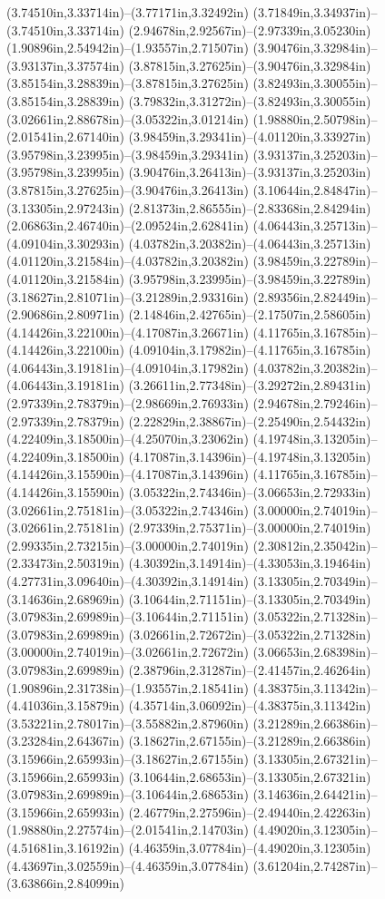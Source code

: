(3.74510in,3.33714in)--(3.77171in,3.32492in) (3.71849in,3.34937in)--(3.74510in,3.33714in) (2.94678in,2.92567in)--(2.97339in,3.05230in) (1.90896in,2.54942in)--(1.93557in,2.71507in) (3.90476in,3.32984in)--(3.93137in,3.37574in) (3.87815in,3.27625in)--(3.90476in,3.32984in) (3.85154in,3.28839in)--(3.87815in,3.27625in) (3.82493in,3.30055in)--(3.85154in,3.28839in) (3.79832in,3.31272in)--(3.82493in,3.30055in) (3.02661in,2.88678in)--(3.05322in,3.01214in) (1.98880in,2.50798in)--(2.01541in,2.67140in) (3.98459in,3.29341in)--(4.01120in,3.33927in) (3.95798in,3.23995in)--(3.98459in,3.29341in) (3.93137in,3.25203in)--(3.95798in,3.23995in) (3.90476in,3.26413in)--(3.93137in,3.25203in) (3.87815in,3.27625in)--(3.90476in,3.26413in) (3.10644in,2.84847in)--(3.13305in,2.97243in) (2.81373in,2.86555in)--(2.83368in,2.84294in) (2.06863in,2.46740in)--(2.09524in,2.62841in) (4.06443in,3.25713in)--(4.09104in,3.30293in) (4.03782in,3.20382in)--(4.06443in,3.25713in) (4.01120in,3.21584in)--(4.03782in,3.20382in) (3.98459in,3.22789in)--(4.01120in,3.21584in) (3.95798in,3.23995in)--(3.98459in,3.22789in) (3.18627in,2.81071in)--(3.21289in,2.93316in) (2.89356in,2.82449in)--(2.90686in,2.80971in) (2.14846in,2.42765in)--(2.17507in,2.58605in) (4.14426in,3.22100in)--(4.17087in,3.26671in) (4.11765in,3.16785in)--(4.14426in,3.22100in) (4.09104in,3.17982in)--(4.11765in,3.16785in) (4.06443in,3.19181in)--(4.09104in,3.17982in) (4.03782in,3.20382in)--(4.06443in,3.19181in) (3.26611in,2.77348in)--(3.29272in,2.89431in) (2.97339in,2.78379in)--(2.98669in,2.76933in) (2.94678in,2.79246in)--(2.97339in,2.78379in) (2.22829in,2.38867in)--(2.25490in,2.54432in) (4.22409in,3.18500in)--(4.25070in,3.23062in) (4.19748in,3.13205in)--(4.22409in,3.18500in) (4.17087in,3.14396in)--(4.19748in,3.13205in) (4.14426in,3.15590in)--(4.17087in,3.14396in) (4.11765in,3.16785in)--(4.14426in,3.15590in) (3.05322in,2.74346in)--(3.06653in,2.72933in) (3.02661in,2.75181in)--(3.05322in,2.74346in) (3.00000in,2.74019in)--(3.02661in,2.75181in) (2.97339in,2.75371in)--(3.00000in,2.74019in) (2.99335in,2.73215in)--(3.00000in,2.74019in) (2.30812in,2.35042in)--(2.33473in,2.50319in) (4.30392in,3.14914in)--(4.33053in,3.19464in) (4.27731in,3.09640in)--(4.30392in,3.14914in) (3.13305in,2.70349in)--(3.14636in,2.68969in) (3.10644in,2.71151in)--(3.13305in,2.70349in) (3.07983in,2.69989in)--(3.10644in,2.71151in) (3.05322in,2.71328in)--(3.07983in,2.69989in) (3.02661in,2.72672in)--(3.05322in,2.71328in) (3.00000in,2.74019in)--(3.02661in,2.72672in) (3.06653in,2.68398in)--(3.07983in,2.69989in) (2.38796in,2.31287in)--(2.41457in,2.46264in) (1.90896in,2.31738in)--(1.93557in,2.18541in) (4.38375in,3.11342in)--(4.41036in,3.15879in) (4.35714in,3.06092in)--(4.38375in,3.11342in) (3.53221in,2.78017in)--(3.55882in,2.87960in) (3.21289in,2.66386in)--(3.23284in,2.64367in) (3.18627in,2.67155in)--(3.21289in,2.66386in) (3.15966in,2.65993in)--(3.18627in,2.67155in) (3.13305in,2.67321in)--(3.15966in,2.65993in) (3.10644in,2.68653in)--(3.13305in,2.67321in) (3.07983in,2.69989in)--(3.10644in,2.68653in) (3.14636in,2.64421in)--(3.15966in,2.65993in) (2.46779in,2.27596in)--(2.49440in,2.42263in) (1.98880in,2.27574in)--(2.01541in,2.14703in) (4.49020in,3.12305in)--(4.51681in,3.16192in) (4.46359in,3.07784in)--(4.49020in,3.12305in) (4.43697in,3.02559in)--(4.46359in,3.07784in) (3.61204in,2.74287in)--(3.63866in,2.84099in) 